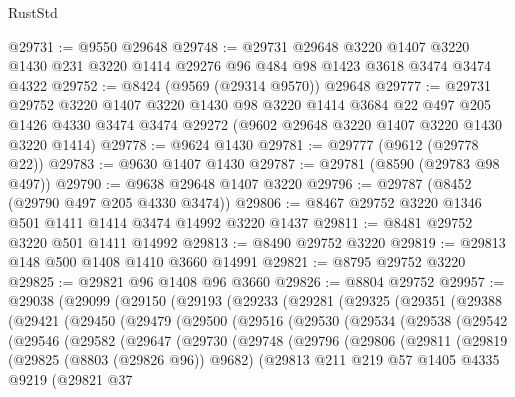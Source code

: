 \begin{lexlean}{RustStd}
\begin{coremodule}
@29731 := @9550 @29648
@29748 := @29731
    @29648
    @3220
    @1407
    @3220
    @1430
    @231
    @3220
    @1414
    @29276
    @96
    @484
    @98
    @1423
    @3618
    @3474
    @3474
    @4322
@29752 := @8424 (@9569 (@29314 @9570)) @29648
@29777 := @29731
    @29752
    @3220
    @1407
    @3220
    @1430
    @98
    @3220
    @1414
    @3684
    @22
    @497
    @205
    @1426
    @4330
    @3474
    @3474
    @29272
    (@9602 @29648 @3220 @1407 @3220 @1430 @3220 @1414)
@29778 := @9624 @1430
@29781 := @29777 (@9612 (@29778 @22))
@29783 := @9630 @1407 @1430
@29787 := @29781 (@8590 (@29783 @98 @497))
@29790 := @9638 @29648 @1407 @3220
@29796 := @29787 (@8452 (@29790 @497 @205 @4330 @3474))
@29806 := @8467 @29752 @3220 @1346 @501 @1411 @1414 @3474 @14992 @3220 @1437
@29811 := @8481 @29752 @3220 @501 @1411 @14992
@29813 := @8490 @29752 @3220
@29819 := @29813 @148 @500 @1408 @1410 @3660 @14991
@29821 := @8795 @29752 @3220
@29825 := @29821 @96 @1408 @96 @3660
@29826 := @8804 @29752
@29957 := @29038
    (@29099
      (@29150
        (@29193
          (@29233
            (@29281
              (@29325
                (@29351
                  (@29388
                    (@29421
                      (@29450
                        (@29479
                          (@29500
                            (@29516
                              (@29530
                                (@29534
                                  (@29538
                                    (@29542
                                      (@29546
                                        (@29582
                                          (@29647
                                            (@29730
                                              (@29748
                                                (@29796
                                                  (@29806
                                                    (@29811
                                                      (@29819
                                                        (@29825 (@8803 (@29826 @96)) @9682)
                                                        (@29813
                                                          @211
                                                          @219
                                                          @57
                                                          @1405
                                                          @4335
                                                          @9219
                                                          (@29821
                                                            @37

\end{coremodule}
\end{lexlean}
